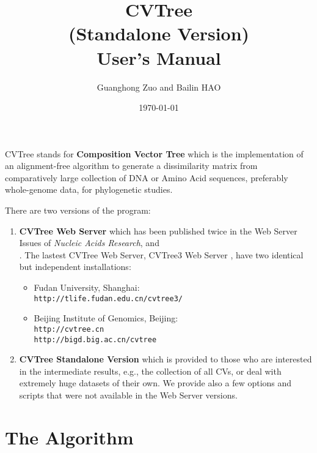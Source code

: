 \documentclass[a4paper,12pt]{article}
\begin{document}
\title{CVTree \\\Large{(Standalone Version)}\\User's Manual}
\author{Guanghong Zuo and Bailin HAO}
\date{\today}
\maketitle


CVTree stands for {\bf Composition Vector Tree} which is the
implementation of an alignment-free algorithm to generate a
dissimilarity matrix from comparatively large collection of DNA or Amino
Acid sequences, preferably whole-genome data, for phylogenetic studies.

There are two versions of the program:
\begin{enumerate}\itemsep 0pt
\item {\bf CVTree Web Server} which has been published twice in the Web
  Server Issues of {\it Nucleic Acids Research}, \cite{qlh04}
  and\\ \cite{xh09}. The lastest CVTree Web Server, CVTree3 Web Server \cite{zh15}, have two identical but independent installations:
  \begin{itemize}
  	\item Fudan University, Shanghai: \\
  	  {\tt http://tlife.fudan.edu.cn/cvtree3/} 
  	\item Beijing Institute of Genomics, Beijing:\\
  	{\tt http://cvtree.cn \\ http://bigd.big.ac.cn/cvtree} 
  \end{itemize}

\item {\bf CVTree Standalone Version} which is provided to those who are
  interested in the intermediate results, e.g., the collection of all
  CVs, or deal with extremely huge datasets of their own. We provide
  also a few options and scripts that were not available in the Web
  Server versions. 
\end{enumerate}

\section{The Algorithm}
\end{document}

